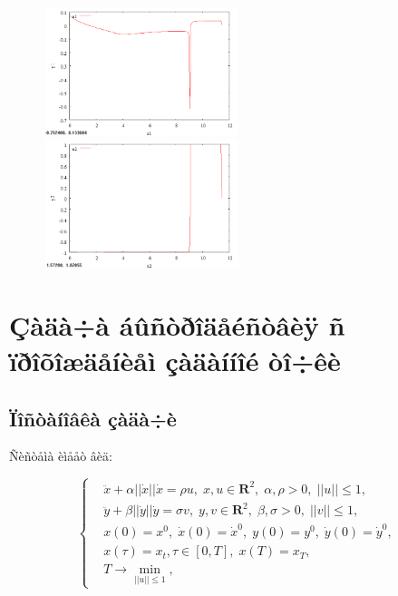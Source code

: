 \documentclass[14pt]{article}
\begin{document}
\begin{figure}
\begin{floatrow}
    {\includegraphics[width=0.5\textwidth]{task2_u1}}
    {\includegraphics[width=0.5\textwidth]{task2_u2}}
\end{floatrow}
\end{figure}

\newpage
\section{Çàäà÷à áûñòðîäåéñòâèÿ ñ ïðîõîæäåíèåì çàäàííîé òî÷êè}
\subsection{Ïîñòàíîâêà çàäà÷è}

Ñèñòåìà èìååò âèä:

\begin{equation}\label{syst3}
\left\{ \begin{aligned}
& \ddot{x}+\alpha||\dot{x}||\dot{x} = \rho u, \; x,u \in \textbf{R}^2, \; \alpha,\rho > 0,\;  ||u|| \le 1, \\
& \ddot{y}+\beta||\dot{y}||\dot{y} = \sigma v, \; y,v \in \textbf{R}^2, \; \beta,\sigma > 0,\;  ||v|| \le 1, \\
& x(0)=x^0, \; \dot{x}(0) = \dot{x}^0, \; y(0)=y^0, \; \dot{y}(0) = \dot{y}^0, \\
& x(\tau)=x_t, \tau \in [0,T], \; x(T)=x_T, \\
& T \rightarrow \min_{||u|| \le 1},
\end{aligned}\right.
\end{equation}
\end{document}
